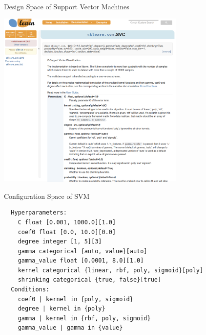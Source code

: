 \begin{frame}[c]{Design Space of Support Vector Machines}

\centering
\includegraphics[width=0.7\textwidth]{images/sklearn_svm_doc.png}

\end{frame}
\begin{frame}[c, fragile]{Configuration Space of SVM}

\begin{verbatim}
  Hyperparameters:
    C float [0.001, 1000.0][1.0]
    coef0 float [0.0, 10.0][0.0]
    degree integer [1, 5][3]
    gamma categorical {auto, value}[auto]
    gamma_value float [0.0001, 8.0][1.0]
    kernel categorical {linear, rbf, poly, sigmoid}[poly]
    shrinking categorical {true, false}[true]
  Conditions:
    coef0 | kernel in {poly, sigmoid}
    degree | kernel in {poly}
    gamma | kernel in {rbf, poly, sigmoid}
    gamma_value | gamma in {value}
\end{verbatim}

\end{frame}
